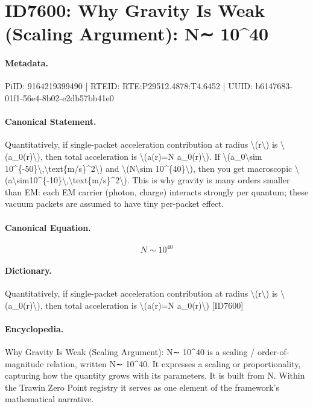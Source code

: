 \section*{ID7600: Why Gravity Is Weak (Scaling Argument): N∼ 10\textasciicircum{}40}
\paragraph{Metadata.}
PiID: 9164219399490 | RTEID: RTE:P29512.4878:T4.6452 | UUID: b6147683-01f1-56e4-8b02-e2db57bb41e0

\paragraph{Canonical Statement.}
Quantitatively, if single-packet acceleration contribution at radius \textbackslash{}(r\textbackslash{}) is \textbackslash{}(a\_0(r)\textbackslash{}), then total acceleration is \textbackslash{}(a(r)=N a\_0(r)\textbackslash{}). If \textbackslash{}(a\_0\textbackslash{}sim 10\textasciicircum{}\{-50\}\textbackslash{},\textbackslash{}text\{m/s\}\textasciicircum{}2\textbackslash{}) and \textbackslash{}(N\textbackslash{}sim 10\textasciicircum{}\{40\}\textbackslash{}), then you get macroscopic \textbackslash{}(a\textbackslash{}sim10\textasciicircum{}\{-10\}\textbackslash{},\textbackslash{}text\{m/s\}\textasciicircum{}2\textbackslash{}). This is why gravity is many orders smaller than EM: each EM carrier (photon, charge) interacts strongly per quantum; these vacuum packets are assumed to have tiny per-packet effect.

\paragraph{Canonical Equation.}
\[
N\sim 10^{40}
\]

\paragraph{Dictionary.}
Quantitatively, if single-packet acceleration contribution at radius \textbackslash{}(r\textbackslash{}) is \textbackslash{}(a\_0(r)\textbackslash{}), then total acceleration is \textbackslash{}(a(r)=N a\_0(r)\textbackslash{}) [ID7600]

\paragraph{Encyclopedia.}
Why Gravity Is Weak (Scaling Argument): N∼ 10\textasciicircum{}40 is a scaling / order-of-magnitude relation, written N∼ 10\textasciicircum{}40. It expresses a scaling or proportionality, capturing how the quantity grows with its parameters. It is built from N. Within the Trawin Zero Point registry it serves as one element of the framework's mathematical narrative.
